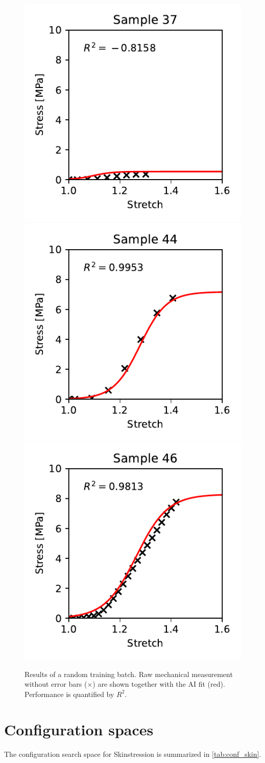 \begin{figure}
    \includegraphics[width=0.24\linewidth]{skinstression/images/training/sample_37_0.pdf} \\
    \includegraphics[width=0.24\linewidth]{skinstression/images/training/sample_44_1.pdf}
    \includegraphics[width=0.24\linewidth]{skinstression/images/training/sample_46_0.pdf}
    \caption[Training results]{
        Results of a random training batch.
        Raw mechanical measurement without error bars ($\times$) are shown together with the AI fit (red).
        Performance is quantified by $R^2$.
    }
    \label{fig:skinstression-train-logistic-curves}
\end{figure}

\section{Configuration spaces}\label{app:skin_conf_search_spaces}
The configuration search space for Skinstression is summarized in \cref{tab:conf_skin}.

